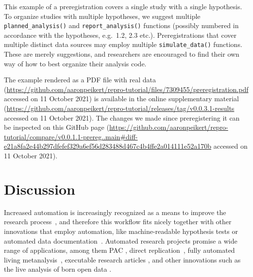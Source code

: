 \documentclass[psych,tutorial,accept,moreauthors,pdftex]{Definitions/mdpi}
\begin{document}
\begin{paracol}{2}
\switchcolumn


This example of a preregistration covers a single study with a single
hypothesis. To organize studies with multiple hypotheses, we suggest
multiple \texttt{planned\_analysis()} and \texttt{report\_analysis()}
functions (possibly numbered in accordance with the hypotheses,
e.g.~1.2, 2.3 etc.). Preregistrations that cover multiple distinct data
sources may employ multiple \texttt{simulate\_data()} functions. These
are merely suggestions, and researchers are encouraged to find their own
way of how to best organize their analysis code.

The example rendered as a {PDF file with real data}
(\url{https://github.com/aaronpeikert/repro-tutorial/files/7309455/preregistration.pdf} accessed on 11 October 2021) is available in the {online supplementary material}
(\url{https://github.com/aaronpeikert/repro-tutorial/releases/tag/v0.0.3.1-results} accessed on 11 October 2021). The changes we made since preregistering it can
be inspected on this {GitHub page}
(\url{https://github.com/aaronpeikert/repro-tutorial/compare/v0.0.1.1-prereg..main\#diff-e21a8fa2e44b297dfefef329a6ef56d283488d467c4b4ffe2a014111e52a170b} accessed on 11 October 2021).

\section{Discussion}\label{discussion}

Increased automation is increasingly recognized as a means to improve
the research process~\citep{rouderMinimizingMistakesPsychological2019},
and therefore this workflow fits nicely together with other innovations
that employ automation, like machine-readable hypothesis tests
\citep{lakensImprovingTransparencyFalsifiability2021} or automated data
documentation~\citep{arslanHowAutomaticallyDocument2019}. Automated
research projects promise a wide range of applications, among them PAC
\citep[potentially to be submitted as a registered
report][]{nosekRegisteredReports2014, chambersWhatNextRegistered2019},
direct replication~\citep{simonsValueDirectReplication2014}, fully
automated living metanalysis~\citep{elliottLivingSystematicReviews2014},
executable research articles
\citep{elifesciencespublicationsELifeLaunchesExecutable2020}, and other
innovations such as the live analysis of born open data
\citep{rouderWhatWhyHow2016, kekecsRaisingValueResearch2019}.


\end{paracol}
\end{document}

